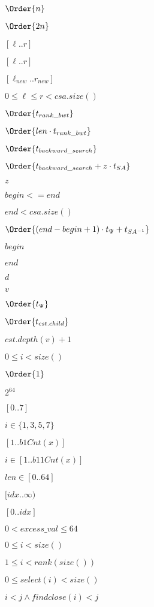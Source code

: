 \documentclass{article}
\begin{document}
$\Order{n}$
\pagebreak

$\Order{2n}$
\pagebreak

$[\ell..r]$
\pagebreak

$ [\ell..r]$
\pagebreak

$ [\ell_{new}..r_{new}] $
\pagebreak

$ 0 \leq \ell \leq r < csa.size() $
\pagebreak

$ \Order{ t_{rank\_bwt} } $
\pagebreak

$ \Order{ len \cdot t_{rank\_bwt} } $
\pagebreak

$ \Order{ t_{backward\_search} } $
\pagebreak

$ \Order{ t_{backward\_search} + z \cdot t_{SA} } $
\pagebreak

$z$
\pagebreak

$begin <= end$
\pagebreak

$ end < csa.size() $
\pagebreak

$ \Order{ (end-begin+1) \cdot t_{\Psi} + t_{SA^{-1}} } $
\pagebreak

$begin$
\pagebreak

$end$
\pagebreak

$d$
\pagebreak

$v$
\pagebreak

$ \Order{ t_{\Psi} } $
\pagebreak

$ \Order{t_{cst.child}} $
\pagebreak

$ cst.depth(v)+1$
\pagebreak

$ 0 \leq i < size() $
\pagebreak

$ \Order{1} $
\pagebreak

$2^64$
\pagebreak

$[0..7]$
\pagebreak

$i\in \{1,3,5,7\}$
\pagebreak

$[1..b1Cnt(x)]$
\pagebreak

$i \in [1..b11Cnt(x)]$
\pagebreak

$ len \in [0..64] $
\pagebreak

$[idx..\infty )$
\pagebreak

$[0..idx]$
\pagebreak

$0<excess\_val \leq 64 $
\pagebreak

$ 0\leq i < size() $
\pagebreak

$1\leq i < rank(size())$
\pagebreak

$ 0\leq select(i) < size() $
\pagebreak

$ i<j \wedge findclose(i) < j $
\pagebreak
\end{document}
